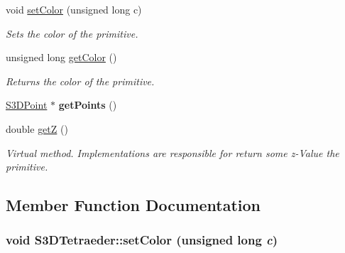 \begin{DoxyCompactItemize}
\item 
void \hyperlink{class_s3_d_tetraeder_a99856377365e5c26c1f86155909725ed}{setColor} (unsigned long c)
\begin{DoxyCompactList}\small\item\em Sets the color of the primitive. \item\end{DoxyCompactList}\item 
\hypertarget{class_s3_d_tetraeder_ab79d98573d008f21c9a77f9d3633d6ae}{
unsigned long \hyperlink{class_s3_d_tetraeder_ab79d98573d008f21c9a77f9d3633d6ae}{getColor} ()}
\label{class_s3_d_tetraeder_ab79d98573d008f21c9a77f9d3633d6ae}

\begin{DoxyCompactList}\small\item\em Returns the color of the primitive. \item\end{DoxyCompactList}\item 
\hypertarget{class_s3_d_tetraeder_a2be4bd418fda569bf8bbfc0fbd70ef1b}{
\hyperlink{class_s3_d_point}{S3DPoint} $\ast$ {\bfseries getPoints} ()}
\label{class_s3_d_tetraeder_a2be4bd418fda569bf8bbfc0fbd70ef1b}

\item 
\hypertarget{class_s3_d_tetraeder_a5f77481efa810aafb63e9d1d5c14ceea}{
double \hyperlink{class_s3_d_tetraeder_a5f77481efa810aafb63e9d1d5c14ceea}{getZ} ()}
\label{class_s3_d_tetraeder_a5f77481efa810aafb63e9d1d5c14ceea}

\begin{DoxyCompactList}\small\item\em Virtual method. Implementations are responsible for return some z-\/Value the primitive. \item\end{DoxyCompactList}\end{DoxyCompactItemize}


\subsection{Member Function Documentation}
\hypertarget{class_s3_d_tetraeder_a99856377365e5c26c1f86155909725ed}{
\subsubsection[{setColor}]{\setlength{\rightskip}{0pt plus 5cm}void S3DTetraeder::setColor (unsigned long {\em c})}}
\label{class_s3_d_tetraeder_a99856377365e5c26c1f86155909725ed}


